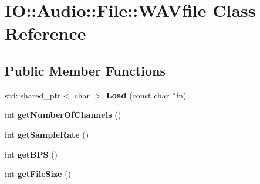 \hypertarget{class_i_o_1_1_audio_1_1_file_1_1_w_a_vfile}{}\section{IO\+:\+:Audio\+:\+:File\+:\+:W\+A\+Vfile Class Reference}
\label{class_i_o_1_1_audio_1_1_file_1_1_w_a_vfile}
\subsection*{Public Member Functions}
\begin{DoxyCompactItemize}
\item 
std\+::shared\+\_\+ptr$<$ char $>$ {\bfseries Load} (const char $\ast$fn)\hypertarget{class_i_o_1_1_audio_1_1_file_1_1_w_a_vfile_a2829421da3f0b8862c81bd8eed16bae4}{}\label{class_i_o_1_1_audio_1_1_file_1_1_w_a_vfile_a2829421da3f0b8862c81bd8eed16bae4}

\item 
int {\bfseries get\+Number\+Of\+Channels} ()\hypertarget{class_i_o_1_1_audio_1_1_file_1_1_w_a_vfile_a2bff19716f5e6dd36adccdcc7c123a64}{}\label{class_i_o_1_1_audio_1_1_file_1_1_w_a_vfile_a2bff19716f5e6dd36adccdcc7c123a64}

\item 
int {\bfseries get\+Sample\+Rate} ()\hypertarget{class_i_o_1_1_audio_1_1_file_1_1_w_a_vfile_a63476668ab4ecd805a7f7b5e729247ed}{}\label{class_i_o_1_1_audio_1_1_file_1_1_w_a_vfile_a63476668ab4ecd805a7f7b5e729247ed}

\item 
int {\bfseries get\+B\+PS} ()\hypertarget{class_i_o_1_1_audio_1_1_file_1_1_w_a_vfile_ae9bad7bf6eb12e78acef3e1422714ea5}{}\label{class_i_o_1_1_audio_1_1_file_1_1_w_a_vfile_ae9bad7bf6eb12e78acef3e1422714ea5}

\item 
int {\bfseries get\+File\+Size} ()\hypertarget{class_i_o_1_1_audio_1_1_file_1_1_w_a_vfile_a15fb3982710c60330713924bd9bdfc62}{}\label{class_i_o_1_1_audio_1_1_file_1_1_w_a_vfile_a15fb3982710c60330713924bd9bdfc62}

\end{DoxyCompactItemize}

